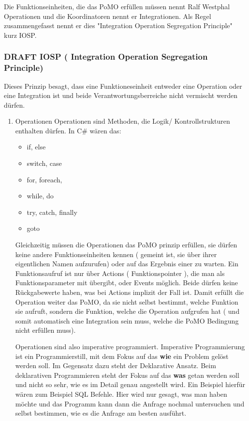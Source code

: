 \documentclass[11pt]{article}
\begin{document}
Die Funktionseinheiten, die das PoMO erfüllen müssen nennt Ralf Westphal Operationen und die Koordinatoren nennt er
Integrationen. Als Regel zusammengefasst nennt er dies "Integration Operation Segregation Principle" kurz IOSP.


\subsubsection{{\bfseries\sffamily DRAFT} IOSP ( Integration Operation Segregation Principle)}
\label{sec:orgheadline32}

Dieses Prinzip besagt, dass eine Funktioneseinheit entweder eine Operation oder eine Integration ist und beide
Verantwortungsberreiche nicht vermischt werden dürfen.

\begin{enumerate}
\item Operationen
\label{sec:orgheadline30}
Operationen sind Methoden, die Logik/ Kontrollstrukturen enthalten dürfen. In C\# wären das:
\begin{itemize}
\item if, else
\item switch, case
\item for, foreach,
\item while, do
\item try, catch, finally
\item goto
\end{itemize}




Gleichzeitig müssen die Operationen das PoMO prinzip erfüllen, sie dürfen keine
andere Funktionseinheiten kennen ( gemeint ist, sie über ihrer eigentlichen
Namen aufzurufen) oder auf das Ergebnis einer zu warten. 
Ein Funktionsaufruf ist nur über Actions ( Funktionspointer ), die man als Funktionsparameter mit übergibt, oder Events möglich.
Beide dürfen keine Rückgabewerte haben, was bei Actions implizit der Fall ist.
Damit erfüllt die Operation weiter das PoMO, da sie nicht selbst bestimmt, welche Funktion sie aufruft, sondern die Funktion,
welche die Operation aufgrufen hat ( und somit automatisch eine Integration sein muss, welche die PoMO Bedingung nicht erfüllen muss).


Operationen sind also imperative programmiert. Imperative Programmierung ist ein Programmierstill,
mit dem Fokus auf das \textbf{wie} ein Problem gelöst werden soll.
Im Gegensatz dazu steht der Deklarative Ansatz.
Beim deklarativen Programmieren steht der Fokus auf das \textbf{was} getan werden soll und nicht so sehr,
wie es im Detail genau angestellt wird. Ein Beispiel hierfür wären zum Beispiel SQL Befehle.
Hier wird nur gesagt, was man haben möchte und das Programm kann dann die Anfrage nochmal untersuchen
und selbst bestimmen, wie es die Anfrage am besten ausführt.


\end{enumerate}
\end{document}

